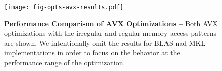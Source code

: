 
\begin{figure}[b]

  \centering
  \texttt{[image: fig-opts-avx-results.pdf]}

  \caption{\textbf{Performance Comparison of AVX Optimizations --}
    Both AVX optimizations with the irregular and regular memory access
    patterns are shown. We intentionally omit the results for BLAS nad
    MKL implementations in order to focus on the behavior at the
    performance range of the optimization.}

  \label{fig-opts-avx-results}

\end{figure}
